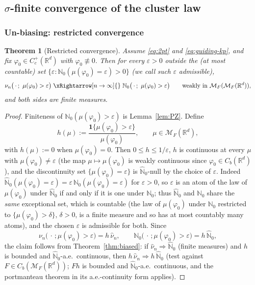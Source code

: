 \documentclass[11pt]{article}
\newtheorem{theorem}{Theorem}[section]
\theoremstyle{definition}
\theoremstyle{remark}
\newcommand{\R}{\mathbb{R}}
\newcommand{\bN}{{\mathbb{N}_0}}                 %
\newcommand{\cM}{{\mathcal{M}_F(\R^d)}}          %
\newcommand{\cMM}{{\mathcal{M}_F(\mathcal{M}_F(\R^d))}}
\newcommand{\Cc}{C_c^+(\R^d)}
\newcommand{\eps}{\varepsilon}
\newcommand{\nuh}{\hat{\nu}}
\newcommand{\Nh}{\hat{\mathbb{N}}_0}
\numberwithin{equation}{section}
\theoremstyle{plain}
\theoremstyle{definition}
\theoremstyle{remark}
\theoremstyle{plain}
\begin{document}
\subsection{$\sigma$-finite convergence of the cluster law}
\label{sec:sigmafinite}

\subsubsection{Un-biasing: restricted convergence}

\begin{theorem}[Restricted convergence]\label{thm:restricted}
 Assume \eqref{eq:2pt} and \eqref{eq:guiding-kp}, and fix
$\varphi_0\in\Cc$ with $\varphi_0\not\equiv0$. Then for every $\eps>0$ outside the (at
most countable) set $\{\eps:\bN(\mu(\varphi_0)=\eps)>0\}$
(we call such $\eps$ \emph{admissible}),
\[
\nu_n\bigl(\,\cdot\,;\ \mu(\varphi_0)>\eps\bigr)
\;\xRightarrow[n\to\infty]{}\;
\bN\bigl(\,\cdot\,;\ \mu(\varphi_0)>\eps\bigr)
\qquad\text{weakly in }\cMM,
\]
and both sides are finite measures.
\end{theorem}

\begin{proof}
Finiteness of $\bN(\mu(\varphi_0)>\eps)$ is Lemma~\ref{lem:PZ}. Define
\[
h(\mu):=\frac{\mathbf 1\{\mu(\varphi_0)>\eps\}}{\mu(\varphi_0)},
\qquad \mu\in\cM,
\]
with $h(\mu):=0$ when $\mu(\varphi_0)=0$. Then $0\le h\le1/\eps$, $h$
is continuous at every $\mu$ with $\mu(\varphi_0)\neq\eps$ (the map
$\mu\mapsto\mu(\varphi_0)$ is weakly continuous since
$\varphi_0\in C_b(\R^d)$), and the discontinuity set
$\{\mu(\varphi_0)=\eps\}$ is $\Nh$-null by the choice of $\eps$. Indeed
$\Nh(\mu(\varphi_0)=\eps)=\eps\,\bN(\mu(\varphi_0)=\eps)$ for $\eps>0$, so
$\eps$ is an atom of the law of $\mu(\varphi_0)$ under $\Nh$ if and only if it is
one under $\bN$; thus $\Nh$ and $\bN$ share the \emph{same} exceptional set,
which is countable (the law of $\mu(\varphi_0)$ under $\bN$ restricted to
$\{\mu(\varphi_0)>\delta\}$, $\delta>0$, is a finite measure and so has at most
countably many atoms), and the chosen $\eps$ is admissible for both.
Since
\[
\nu_n\bigl(\,\cdot\,;\mu(\varphi_0)>\eps\bigr)=h\,\nuh_n,
\qquad
\bN\bigl(\,\cdot\,;\mu(\varphi_0)>\eps\bigr)=h\,\Nh,
\]
the claim follows from Theorem~\ref{thm:biased}: if $\nuh_n\Rightarrow\Nh$
(finite measures) and $h$ is bounded and
$\Nh$-a.e.\ continuous, then $h\,\nuh_n\Rightarrow h\,\Nh$ (test against
$F\in C_b(\cM)$; $Fh$ is bounded and $\Nh$-a.e.\ continuous, and the
portmanteau theorem in its a.e.-continuity form applies).
\end{proof}
\end{document}
